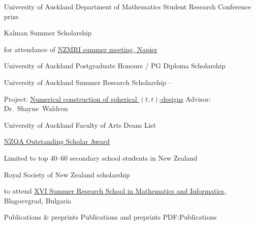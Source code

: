 \documentclass[a4paper,yyyy,nonstopmode,10pt]{simpleresumecv}
\begin{document}
\begin{Body}
\Gap
\BulletItem
University of Auckland Department of Mathematics Student Research Conference prize
\hfill
{}

\Gap
\BulletItem
Kalman Summer Scholarship
\hfill
{}
\begin{Detail}
\SubBulletItem
for attendance of \href{https://www.math.auckland.ac.nz/~conder/NZMRI-Napier-2021/}{NZMRI summer meeting, Napier}
\end{Detail}

\Gap
\BulletItem
University of Auckland Postgraduate Honours / PG Diploma Scholarship
\hfill
{}

\Gap
\BulletItem
University of Auckland Summer Research Scholarship
\hfill
{}--
\begin{Detail}
\SubBulletItem
Project: \href{https://aelzenaar.github.io/tight_frames/scholarship_report.pdf}{Numerical construction of spherical $ (t,t)$-designs}
\SubBulletItem
Advisor:
Dr.~Shayne~Waldron
\end{Detail}

\Gap
\BulletItem
University of Auckland Faculty of Arts Deans List
\hfill
{}

\Gap
\BulletItem
\href{https://web.archive.org/web/20170211162000/http://www.nzqa.govt.nz/about-us/news/2016-outstanding-scholar-award-winners}{NZQA Outstanding Scholar Award}
\hfill
{}
\begin{Detail}
\SubBulletItem
Limited to top 40--60 secondary school students in New Zealand
%
\end{Detail}
\Gap
\BulletItem
Royal Society of New Zealand scholarship
\hfill
{}
\begin{Detail}
\SubBulletItem
to attend \href{https://web.archive.org/web/20161023213407/http://www.math.bas.bg/omi/hssimi/}{XVI Summer Research School in Mathematics and Informatics}, Blagoevgrad, Bulgaria
\end{Detail}




\Section
{Publications \& preprints}
{Publications and preprints}
{PDF:Publications}


\begingroup
\renewcommand{\MaxNumberedItem}{[88]}


\end{Body}
\end{document}
